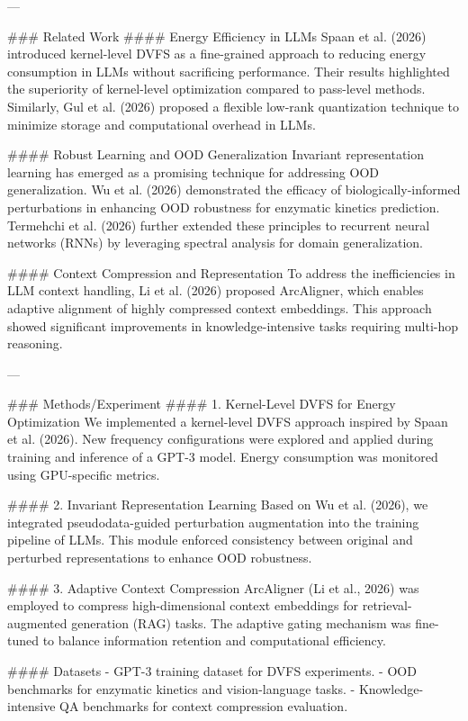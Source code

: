 ---

### Related Work
#### Energy Efficiency in LLMs
Spaan et al. (2026) introduced kernel-level DVFS as a fine-grained approach to reducing energy consumption in LLMs without sacrificing performance. Their results highlighted the superiority of kernel-level optimization compared to pass-level methods. Similarly, Gul et al. (2026) proposed a flexible low-rank quantization technique to minimize storage and computational overhead in LLMs.

#### Robust Learning and OOD Generalization
Invariant representation learning has emerged as a promising technique for addressing OOD generalization. Wu et al. (2026) demonstrated the efficacy of biologically-informed perturbations in enhancing OOD robustness for enzymatic kinetics prediction. Termehchi et al. (2026) further extended these principles to recurrent neural networks (RNNs) by leveraging spectral analysis for domain generalization.

#### Context Compression and Representation
To address the inefficiencies in LLM context handling, Li et al. (2026) proposed ArcAligner, which enables adaptive alignment of highly compressed context embeddings. This approach showed significant improvements in knowledge-intensive tasks requiring multi-hop reasoning.

---

### Methods/Experiment
#### 1. Kernel-Level DVFS for Energy Optimization
We implemented a kernel-level DVFS approach inspired by Spaan et al. (2026). New frequency configurations were explored and applied during training and inference of a GPT-3 model. Energy consumption was monitored using GPU-specific metrics.

#### 2. Invariant Representation Learning
Based on Wu et al. (2026), we integrated pseudodata-guided perturbation augmentation into the training pipeline of LLMs. This module enforced consistency between original and perturbed representations to enhance OOD robustness.

#### 3. Adaptive Context Compression
ArcAligner (Li et al., 2026) was employed to compress high-dimensional context embeddings for retrieval-augmented generation (RAG) tasks. The adaptive gating mechanism was fine-tuned to balance information retention and computational efficiency.

#### Datasets
- GPT-3 training dataset for DVFS experiments.
- OOD benchmarks for enzymatic kinetics and vision-language tasks.
- Knowledge-intensive QA benchmarks for context compression evaluation.

